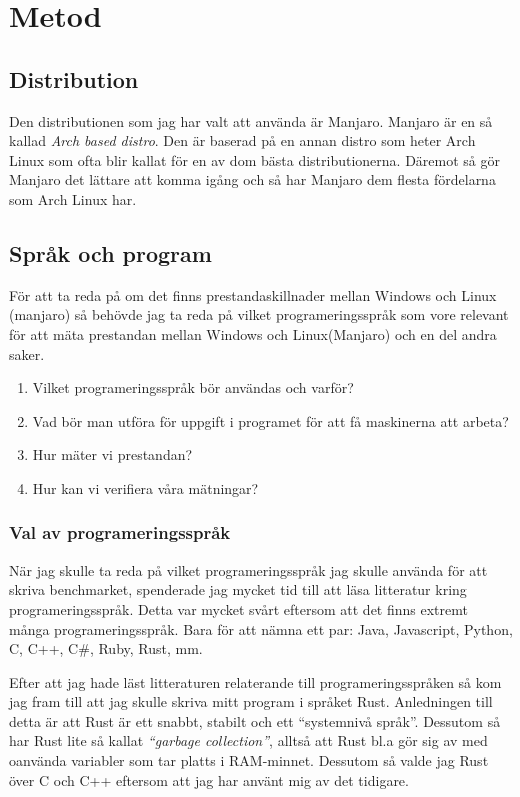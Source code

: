 \documentclass[12pt, a4paper]{report}
\begin{document}
 
\section{Metod}
 
\subsection{Distribution}
Den distributionen som jag har valt att använda är Manjaro\cite{manjaro}. Manjaro är en så kallad \textit{Arch based distro}. Den är baserad på en annan distro som heter Arch Linux som ofta blir kallat för en av dom bästa distributionerna\cite{archIsTheBest}. Däremot så gör Manjaro det lättare att komma igång och så har Manjaro dem flesta fördelarna som Arch Linux har.

\subsection{Språk och program}
 
För att ta reda på om det finns prestandaskillnader mellan Windows och Linux (manjaro) så behövde jag ta reda på vilket programeringsspråk som vore relevant för att mäta prestandan mellan Windows och Linux(Manjaro) och en del andra saker.

\begin{enumerate}
   \item Vilket programeringsspråk bör användas och varför?
   \item Vad bör man utföra för uppgift i programet för att få maskinerna att arbeta?
   \item Hur mäter vi prestandan?
   \item Hur kan vi verifiera våra mätningar?
\end{enumerate}
 

\subsubsection{Val av programeringsspråk}

När jag skulle ta reda på vilket programeringsspråk jag skulle använda för att skriva benchmarket, spenderade jag mycket tid till att läsa litteratur kring programeringsspråk. Detta var mycket svårt eftersom att det finns extremt många programeringsspråk. Bara för att nämna ett par: Java, Javascript, Python, C, C++, C\#, Ruby, Rust, mm. 


Efter att jag hade läst litteraturen relaterande till programeringsspråken så kom jag fram till att jag skulle skriva mitt program i språket Rust.\cite{rust} Anledningen till detta är att Rust är ett snabbt, stabilt och ett ``systemnivå språk''. Dessutom så har Rust lite så kallat \textit{``garbage collection''}\cite{garbage}, alltså att Rust bl.a gör sig av med oanvända variabler som tar platts i RAM-minnet. Dessutom så valde jag Rust över C och C++ eftersom att jag har använt mig av det tidigare.
\end{document}
